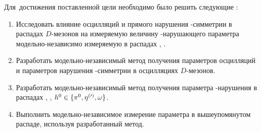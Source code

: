 Для~достижения поставленной цели необходимо было решить следующие {\tasks}:
\begin{enumerate}
  \item Исследовать влияние осцилляций и прямого нарушения \cpconj-симметрии в распадах $D$-мезонов на измеряемую величину \cpconj-нарушающего параметра \gphi модельно-независимо измеряемую в распадах \bdk, \dkpp.
  \item Разработать модельно-независимый метод получения параметров осцилляций и параметров нарушения \cpconj-симметрии в осцилляциях $D$-мезонов.
  \item Разработать модельно-независимый метод получения параметра \cpconj-нарушения \pphi в распадах \bdh, \dbkpp, $h^0\in\{\pi^0,\eta^{(\prime)},\omega\}$.
  \item Выполнить модельно-независимое измерение параметра \pphi в вышеупомянутом распаде, используя разработанный метод.
\end{enumerate}

